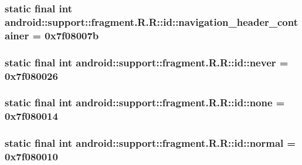 \hypertarget{classandroid_1_1support_1_1fragment_1_1_r_1_1id_1a1ac319fa8f6dcabd0be12124ac0924}{
\subsubsection[{navigation\_\-header\_\-container}]{\setlength{\rightskip}{0pt plus 5cm}static final int android::support::fragment.R.R::id::navigation\_\-header\_\-container = 0x7f08007b}}
\label{classandroid_1_1support_1_1fragment_1_1_r_1_1id_1a1ac319fa8f6dcabd0be12124ac0924}


\hypertarget{classandroid_1_1support_1_1fragment_1_1_r_1_1id_08f86857baab8a8ad53221218145961d}{
\subsubsection[{never}]{\setlength{\rightskip}{0pt plus 5cm}static final int android::support::fragment.R.R::id::never = 0x7f080026}}
\label{classandroid_1_1support_1_1fragment_1_1_r_1_1id_08f86857baab8a8ad53221218145961d}


\hypertarget{classandroid_1_1support_1_1fragment_1_1_r_1_1id_8a1b796c4a3c1f8871c4f01f897f0b45}{
\subsubsection[{none}]{\setlength{\rightskip}{0pt plus 5cm}static final int android::support::fragment.R.R::id::none = 0x7f080014}}
\label{classandroid_1_1support_1_1fragment_1_1_r_1_1id_8a1b796c4a3c1f8871c4f01f897f0b45}


\hypertarget{classandroid_1_1support_1_1fragment_1_1_r_1_1id_e4838bcff3d7687f5a916b8d09dbb7dd}{
\subsubsection[{normal}]{\setlength{\rightskip}{0pt plus 5cm}static final int android::support::fragment.R.R::id::normal = 0x7f080010}}
\label{classandroid_1_1support_1_1fragment_1_1_r_1_1id_e4838bcff3d7687f5a916b8d09dbb7dd}


